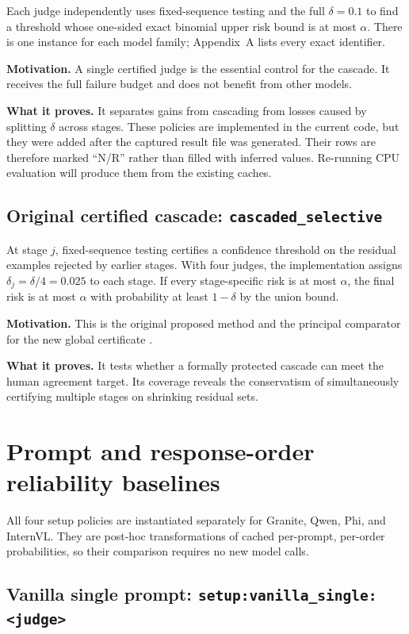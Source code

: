 \documentclass[10pt]{article}
\DeclareRobustCommand{\method}[1]{\nolinkurl{#1}}
\begin{document}
Each judge independently uses fixed-sequence testing and the full $\delta=0.1$ to find a
threshold whose one-sided exact binomial upper risk bound is at most $\alpha$. There is one
instance for each model family; Appendix~A lists every exact identifier.

\textbf{Motivation.} A single certified judge is the essential control for the cascade.
It receives the full failure budget and does not benefit from other models.

\textbf{What it proves.} It separates gains from cascading from losses caused by splitting
$\delta$ across stages. These policies are implemented in the current code, but they were
added after the captured result file was generated. Their rows are therefore marked
``N/R'' rather than filled with inferred values. Re-running CPU evaluation will produce
them from the existing caches.

\subsection[Original certified cascade]{Original certified cascade: \method{cascaded_selective}}

At stage $j$, fixed-sequence testing certifies a confidence threshold on the residual
examples rejected by earlier stages. With four judges, the implementation assigns
$\delta_j=\delta/4=0.025$ to each stage. If every stage-specific risk is at most $\alpha$,
the final risk is at most $\alpha$ with probability at least $1-\delta$ by the union bound.

\textbf{Motivation.} This is the original proposed method and the principal comparator
for the new global certificate \cite{jung2024trust}.

\textbf{What it proves.} It tests whether a formally protected cascade can meet the human
agreement target. Its coverage reveals the conservatism of simultaneously certifying
multiple stages on shrinking residual sets.

\section{Prompt and response-order reliability baselines}

All four setup policies are instantiated separately for Granite, Qwen, Phi, and InternVL.
They are post-hoc transformations of cached per-prompt, per-order probabilities, so their
comparison requires no new model calls.

\subsection[Vanilla single prompt]{Vanilla single prompt: \method{setup:vanilla_single:<judge>}}
\end{document}
